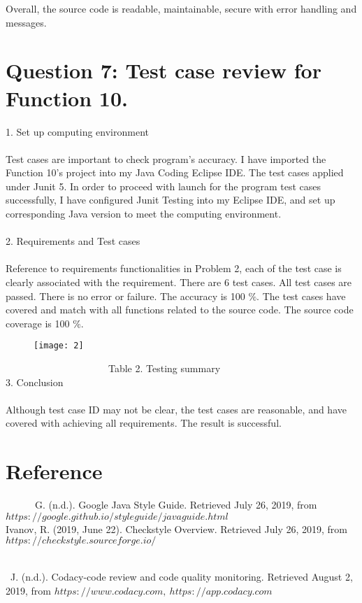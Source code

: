 \documentclass{article}
\begin{document}
Overall, the source code is readable, maintainable, secure with error handling and messages.   \\



\newpage

\section{Question 7: Test case review for Function 10. }
1. Set up computing environment \\ \\
Test cases are important to check program’s accuracy. I have imported the Function 10’s project into my Java Coding Eclipse IDE. The test cases applied under Junit 5. In order to proceed with launch for the program test cases successfully, I have configured Junit Testing into my Eclipse IDE, and set up corresponding Java version to meet the computing environment. \\ \\
2. Requirements and Test cases \\ \\
Reference to requirements functionalities in Problem 2, each of the test case is clearly associated with the requirement. There are 6 test cases. All test cases are passed. There is no error or failure. The accuracy is 100 $ \% $. The test cases have covered and match with all functions related to the source code. The source code coverage is 100 $ \% $.  \\

\begin{figure}[h]
\begin{center}
\texttt{[image: 2]} 
\end{center}
\end{figure}

 \ \ \ \ \ \ \ \ \ \ \ \ \ \  \ \ \ \ \ \ \ Table 2. Testing summary \\

3. Conclusion \\ \\
Although test case ID may not be clear, the test cases are reasonable, and have covered with achieving all requirements. The result is successful.  \\

\section{Reference}


 \ \ \ \ \ \ G. (n.d.). Google Java Style Guide. Retrieved July 26, 2019, from \\ $ https://google.github.io/styleguide/javaguide.html $ \\


Ivanov, R. (2019, June 22). Checkstyle Overview. Retrieved July 26, 2019, from  $ https://checkstyle.sourceforge.io/  $  \\ \

\ J. (n.d.). Codacy-code review and code quality monitoring. Retrieved August 2, 2019, from $ https://www.codacy.com, \  https://app.codacy.com $ 
\end{document}
